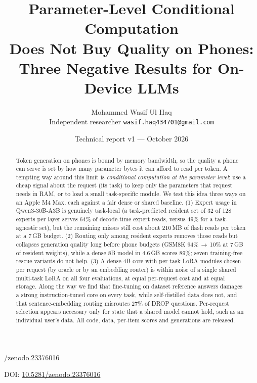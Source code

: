 \documentclass[11pt]{article}
\title{\bfseries Parameter-Level Conditional Computation\\Does Not Buy Quality on Phones:\\Three Negative Results for On-Device LLMs}
\author{Mohammed Wasif Ul Haq\\[2pt]
\small Independent researcher \quad \texttt{wasif.haq434701@gmail.com}}
\date{Technical report v1 --- October 2026}
\newcommand{\reportdoi}{10.5281/zenodo.23376016}  %
\begin{document}
\maketitle
\ifx\reportdoi\empty\else\begin{center}\small DOI: \href{https://doi.org/\reportdoi}{\reportdoi}\end{center}\fi

\begin{abstract}
\noindent Token generation on phones is bound by memory bandwidth, so the quality a phone can serve is set
by how many parameter bytes it can afford to read per token. A tempting way around this limit is
\emph{conditional computation at the parameter level}: use a cheap signal about the request (its task)
to keep only the parameters that request needs in RAM, or to load a small task-specific module. We test
this idea three ways on an Apple M4 Max, each against a fair dense or shared baseline. (1) Expert usage in
Qwen3-30B-A3B is genuinely task-local (a task-predicted resident set of 32 of 128 experts per layer serves
64\% of decode-time expert reads, versus 49\% for a task-agnostic set), but the remaining misses still
cost about 210\,MB of flash reads per token at a 7\,GB budget. (2) Routing only among resident experts
removes those reads but collapses generation quality long before phone budgets (GSM8K 94\%\,$\to$\,10\%
at 7\,GB of resident weights), while a dense 8B model in 4.6\,GB scores 89\%; seven training-free rescue
variants do not help. (3) A dense 4B core with per-task LoRA modules chosen per request (by oracle or by an
embedding router) is within noise of a single shared multi-task LoRA on all four evaluations, at equal
per-request cost and at equal storage. Along the way we find that fine-tuning on dataset reference
answers damages a strong instruction-tuned core on every task, while self-distilled data does not, and
that sentence-embedding routing misroutes 27\% of DROP questions. Per-request selection appears
necessary only for state that a shared model cannot hold, such as an individual user's data. All code,
data, per-item scores and generations are released.
\end{abstract}
\end{document}

